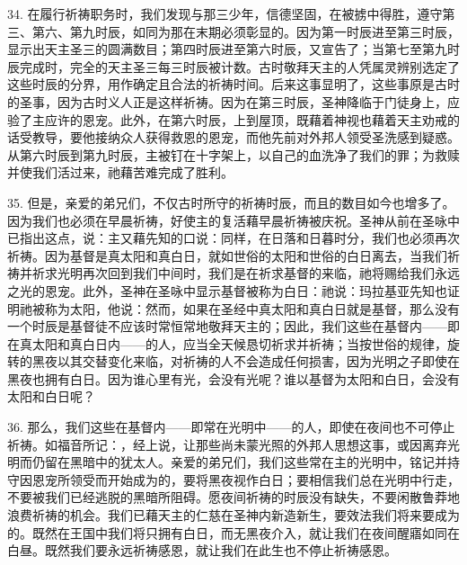 34. 在履行祈祷职务时，我们发现与那三少年，信德坚固，在被掳中得胜，遵守第三、第六、第九时辰，如同为那在末期必须彰显的。因为第一时辰进至第三时辰，显示出天主圣三的圆满数目；第四时辰进至第六时辰，又宣告了；当第七至第九时辰完成时，完全的天主圣三每三时辰被计数。古时敬拜天主的人凭属灵辨别选定了这些时辰的分界，用作确定且合法的祈祷时间。后来这事显明了，这些事原是古时的圣事，因为古时义人正是这样祈祷。因为在第三时辰，圣神降临于门徒身上，应验了主应许的恩宠。此外，在第六时辰，上到屋顶，既藉着神视也藉着天主劝戒的话受教导，要他接纳众人获得救恩的恩宠，而他先前对外邦人领受圣洗感到疑惑。从第六时辰到第九时辰，主被钉在十字架上，以自己的血洗净了我们的罪；为救赎并使我们活过来，祂藉苦难完成了胜利。\par

35. 但是，亲爱的弟兄们，不仅古时所守的祈祷时辰，而且的数目如今也增多了。因为我们也必须在早晨祈祷，好使主的复活藉早晨祈祷被庆祝。圣神从前在圣咏中已指出这点，说：主又藉先知的口说：同样，在日落和日暮时分，我们也必须再次祈祷。因为基督是真太阳和真白日，就如世俗的太阳和世俗的白日离去，当我们祈祷并祈求光明再次回到我们中间时，我们是在祈求基督的来临，祂将赐给我们永远之光的恩宠。此外，圣神在圣咏中显示基督被称为白日：祂说：玛拉基亚先知也证明祂被称为太阳，他说：然而，如果在圣经中真太阳和真白日就是基督，那么没有一个时辰是基督徒不应该时常恒常地敬拜天主的；因此，我们这些在基督内——即在真太阳和真白日内——的人，应当全天候恳切祈求并祈祷；当按世俗的规律，旋转的黑夜以其交替变化来临，对祈祷的人不会造成任何损害，因为光明之子即使在黑夜也拥有白日。因为谁心里有光，会没有光呢？谁以基督为太阳和白日，会没有太阳和白日呢？\par

36. 那么，我们这些在基督内——即常在光明中——的人，即使在夜间也不可停止祈祷。如福音所记：，经上说，让那些尚未蒙光照的外邦人思想这事，或因离弃光明而仍留在黑暗中的犹太人。亲爱的弟兄们，我们这些常在主的光明中，铭记并持守因恩宠所领受而开始成为的，要将黑夜视作白日；要相信我们总在光明中行走，不要被我们已经逃脱的黑暗所阻碍。愿夜间祈祷的时辰没有缺失，不要闲散鲁莽地浪费祈祷的机会。我们已藉天主的仁慈在圣神内新造新生，要效法我们将来要成为的。既然在王国中我们将只拥有白日，而无黑夜介入，就让我们在夜间醒寤如同在白昼。既然我们要永远祈祷感恩，就让我们在此生也不停止祈祷感恩。\par

